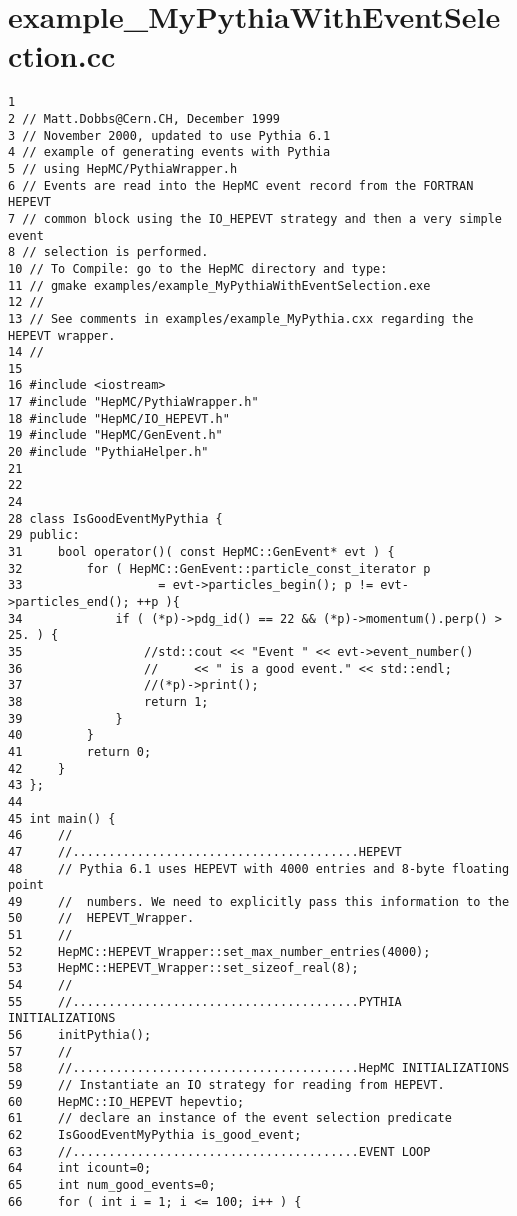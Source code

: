 \section{example\_\-My\-Pythia\-With\-Event\-Selection.cc}


\begin{DocInclude}\begin{verbatim}1 
2 // Matt.Dobbs@Cern.CH, December 1999
3 // November 2000, updated to use Pythia 6.1
4 // example of generating events with Pythia
5 // using HepMC/PythiaWrapper.h 
6 // Events are read into the HepMC event record from the FORTRAN HEPEVT 
7 // common block using the IO_HEPEVT strategy and then a very simple event
8 // selection is performed.
10 // To Compile: go to the HepMC directory and type:
11 // gmake examples/example_MyPythiaWithEventSelection.exe
12 //
13 // See comments in examples/example_MyPythia.cxx regarding the HEPEVT wrapper.
14 //
15 
16 #include <iostream>
17 #include "HepMC/PythiaWrapper.h"
18 #include "HepMC/IO_HEPEVT.h"
19 #include "HepMC/GenEvent.h"
20 #include "PythiaHelper.h"
21 
22 
24 
28 class IsGoodEventMyPythia {
29 public:
31     bool operator()( const HepMC::GenEvent* evt ) { 
32         for ( HepMC::GenEvent::particle_const_iterator p 
33                   = evt->particles_begin(); p != evt->particles_end(); ++p ){
34             if ( (*p)->pdg_id() == 22 && (*p)->momentum().perp() > 25. ) {
35                 //std::cout << "Event " << evt->event_number()
36                 //     << " is a good event." << std::endl;
37                 //(*p)->print();
38                 return 1;
39             }
40         }
41         return 0;
42     }
43 };
44     
45 int main() { 
46     //
47     //........................................HEPEVT
48     // Pythia 6.1 uses HEPEVT with 4000 entries and 8-byte floating point
49     //  numbers. We need to explicitly pass this information to the 
50     //  HEPEVT_Wrapper.
51     //
52     HepMC::HEPEVT_Wrapper::set_max_number_entries(4000);
53     HepMC::HEPEVT_Wrapper::set_sizeof_real(8);
54     //  
55     //........................................PYTHIA INITIALIZATIONS
56     initPythia();
57     //
58     //........................................HepMC INITIALIZATIONS
59     // Instantiate an IO strategy for reading from HEPEVT.
60     HepMC::IO_HEPEVT hepevtio;
61     // declare an instance of the event selection predicate
62     IsGoodEventMyPythia is_good_event;
63     //........................................EVENT LOOP
64     int icount=0;
65     int num_good_events=0;
66     for ( int i = 1; i <= 100; i++ ) {

\end{verbatim}
\end{DocInclude}
